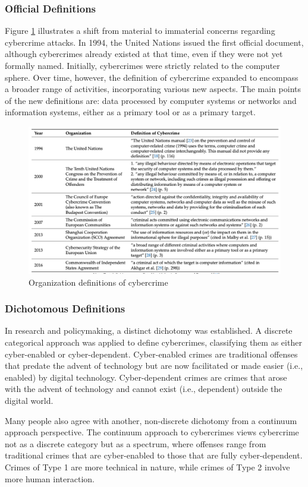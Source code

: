 \subsubsection{Official Definitions}
Figure \ref{fig:Definitions} illustrates a shift from material to immaterial concerns regarding cybercrime attacks. In 1994, the United Nations issued the first official document, although cybercrimes already existed at that time, even if they were not yet formally named. Initially, cybercrimes were strictly related to the computer sphere. Over time, however, the definition of cybercrime expanded to encompass a broader range of activities, incorporating various new aspects. The main points of the new definitions are: data processed by computer systems or networks and information systems, either as a primary tool or as a primary target.

\begin{figure}[H]
    \centering
    \includegraphics[width=0.5\linewidth]{Images/Sociology/Definitions.png}
    \caption{Organization definitions of cybercrime}
    \label{fig:Definitions}
\end{figure}

\subsubsection{Dichotomous Definitions}
\begin{multicols}{2}
    In research and policymaking, a distinct dichotomy was established. A discrete categorical approach was applied to define cybercrimes, classifying them as either cyber-enabled or cyber-dependent. Cyber-enabled crimes are traditional offenses that predate the advent of technology but are now facilitated or made easier (i.e., enabled) by digital technology. Cyber-dependent crimes are crimes that arose with the advent of technology and cannot exist (i.e., dependent) outside the digital world. 
    \columnbreak

    Many people also agree with another, non-discrete dichotomy from a continuum approach perspective. The continuum approach to cybercrimes views cybercrime not as a discrete category but as a spectrum, where offenses range from traditional crimes that are cyber-enabled to those that are fully cyber-dependent. Crimes of Type 1 are more technical in nature, while crimes of Type 2 involve more human interaction.

\end{multicols}

